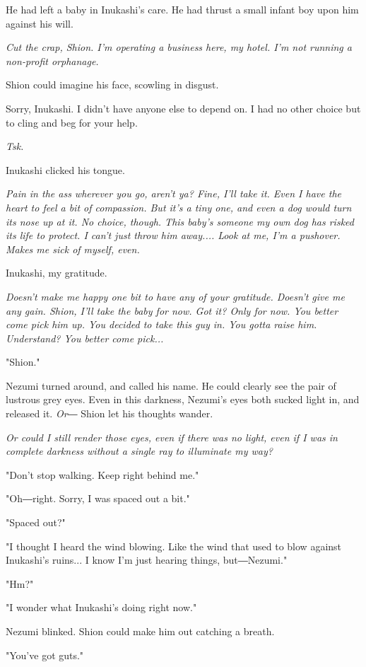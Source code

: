 He had left a baby in Inukashi's care. He had thrust a small infant boy
upon him against his will.

\emph{Cut the crap, Shion. I'm operating a business here, my hotel. I'm not
	running a non-profit orphanage.}

Shion could imagine his face, scowling in disgust.

Sorry, Inukashi. I didn't have anyone else to depend on. I had no other
choice but to cling and beg for your help.

\emph{Tsk.}

Inukashi clicked his tongue.

\emph{Pain in the ass wherever you go, aren't ya? Fine, I'll take it. Even I
	have the heart to feel a bit of compassion. But it's a tiny one, and
	even a dog would turn its nose up at it. No choice, though. This baby's
	someone my own dog has risked its life to protect. I can't just throw
	him away.... Look at me, I'm a pushover. Makes me sick of myself, even.}

Inukashi, my gratitude.

\emph{Doesn't make me happy one bit to have any of your gratitude. Doesn't
	give me any gain. Shion, I'll take the baby \emph{for now}. Got it? Only for
	now. You better come pick him up. You decided to take this guy in. You
	gotta raise him. Understand? You better come pick...}

"Shion."

Nezumi turned around, and called his name. He could clearly see the pair
of lustrous grey eyes. Even in this darkness, Nezumi's eyes both sucked
light in, and released it. \emph{Or―} Shion let his thoughts wander.

\emph{Or could I still render those eyes, even if there was no light, even if
	I was in complete darkness without a single ray to illuminate my way?}

"Don't stop walking. Keep right behind me."

"Oh―right. Sorry, I was spaced out a bit."

"Spaced out?"

"I thought I heard the wind blowing. Like the wind that used to blow
against Inukashi's ruins... I know I'm just hearing things, but―Nezumi."

"Hm?"

"I wonder what Inukashi's doing right now."

Nezumi blinked. Shion could make him out catching a breath.

"You've got guts."

